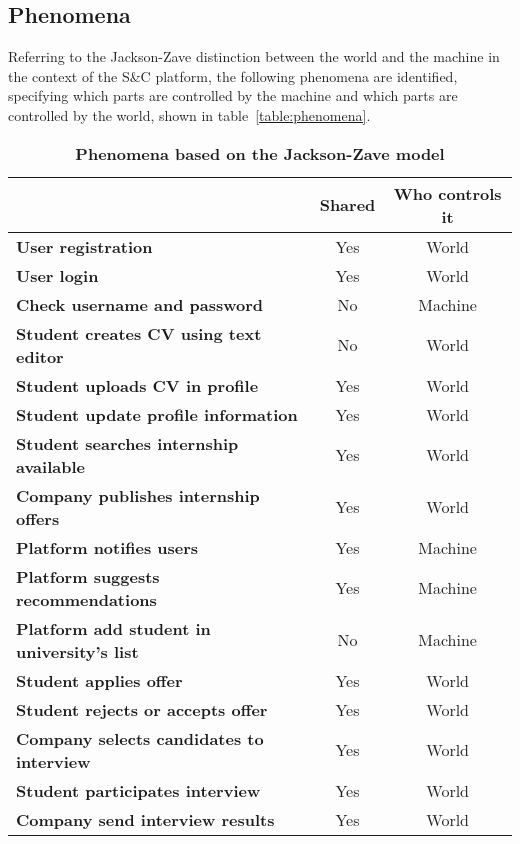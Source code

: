 \subsection{Phenomena}
Referring to the Jackson-Zave distinction between the world and the machine in the context of the S\&C platform, the following phenomena are 
identified, specifying which parts are controlled by the machine and which parts are controlled by the world, shown in table~\ref{table:phenomena}.

\begin{table}[H]
    \caption*{\textbf{Phenomena based on the Jackson-Zave model}}
    \centering 
    \begin{tabular}{|p{20em}|c|c|}
    \hline
    \rowcolor{bluepoli!40} %
     & \textbf{Shared} & \textbf{Who controls it} \T\B \\
    \hline \hline
    \textbf{User registration} & Yes & World \T\B \\
    \textbf{User login} & Yes & World \T\B\\
    \textbf{Check username and password} & No & Machine \T\B\\
    \textbf{Student creates CV using text editor} & No & World  \T\B \\
    \textbf{Student uploads CV in profile} & Yes & World  \T\B \\
    \textbf{Student update profile information} & Yes & World  \T\B \\
    \textbf{Student searches internship available} & Yes & World \T\B\\
    \textbf{Company publishes internship offers} & Yes & World \T\B \\
    \textbf{Platform notifies users} & Yes & Machine \B\\
    \textbf{Platform suggests recommendations} & Yes & Machine \T\B \\
    \textbf{Platform add student in university's list} & No & Machine \T\B \\
    \textbf{Student applies offer} & Yes & World \B\\
    \textbf{Student rejects or accepts offer} & Yes & World \T\B \\
    \textbf{Company selects candidates to interview} & Yes & World \T\B\\
    \textbf{Student participates interview} & Yes & World \T\B \\
    \textbf{Company send interview results} & Yes & World \B\\

\end{tabular}
\end{table}
